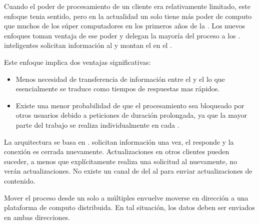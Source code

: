 Cuando el poder de procesamiento de un cliente era relativamente limitado, este enfoque tenia sentido, pero en la actualidad un solo \smartphone tiene más poder de computo que muchos de los súper computadores en los primeros años de la \webINT. Los nuevos enfoques toman ventaja de ese poder y delegan la mayoría del proceso a los \clientsAS. \frontEndsAS inteligentes solicitan información al \serverAS y montan el \htmldom en el \browserINT.

Este enfoque \clientcentric implica dos ventajas significativas:
\begin{itemize}
	\item Menos necesidad de transferencia de información entre el \serverAS y el \clientAS lo que esencialmente se traduce como tiempos de respuestas mas rápidos.
	\item Existe una menor probabilidad de que el procesamiento sea bloqueado por otros usuarios debido a peticiones de duración prolongada, ya que la mayor parte del trabajo se realiza individualmente en cada \clientAS.
\end{itemize}

La arquitectura \clientserver se basa en \statelessconnections. \clientsAS solicitan información una vez, el \serverAS responde y la conexión es cerrada nuevamente. Actualizaciones en otros clientes pueden suceder, a menos que explícitamente realiza una solicitud al \serverAS nuevamente, no verán actualizaciones. No existe un canal de \feedback del \serverAS al \clientAS para enviar actualizaciones de contenido.

Mover el proceso desde un solo \serverAS a múltiples \clientsAS envuelve moverse en dirección a una plataforma de computo distribuida. En tal situación, los datos deben ser enviados en ambas direcciones.

